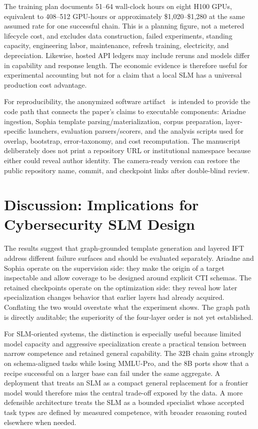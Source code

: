 \documentclass[conference]{IEEEtran}
\begin{document}
The training plan documents 51--64 wall-clock hours on eight H100 GPUs, equivalent to 408--512 GPU-hours or approximately \$1,020--\$1,280 at the same assumed rate for one successful chain. This is a planning figure, not a metered lifecycle cost, and excludes data construction, failed experiments, standing capacity, engineering labor, maintenance, refresh training, electricity, and depreciation. Likewise, hosted API ledgers may include reruns and models differ in capability and response length. The economic evidence is therefore useful for experimental accounting but not for a claim that a local SLM has a universal production cost advantage.

For reproducibility, the anonymized software artifact~\cite{anonartifact} is intended to provide the code path that connects the paper's claims to executable components: Ariadne ingestion, Sophia template parsing/materialization, corpus preparation, layer-specific launchers, evaluation parsers/scorers, and the analysis scripts used for overlap, bootstrap, error-taxonomy, and cost recomputation. The manuscript deliberately does not print a repository URL or institutional namespace because either could reveal author identity. The camera-ready version can restore the public repository name, commit, and checkpoint links after double-blind review.

\section{Discussion: Implications for Cybersecurity SLM Design}
The results suggest that graph-grounded template generation and layered IFT address different failure surfaces and should be evaluated separately. Ariadne and Sophia operate on the supervision side: they make the origin of a target inspectable and allow coverage to be designed around explicit CTI schemas. The retained checkpoints operate on the optimization side: they reveal how later specialization changes behavior that earlier layers had already acquired. Conflating the two would overstate what the experiment shows. The graph path is directly auditable; the superiority of the four-layer order is not yet established.

For SLM-oriented systems, the distinction is especially useful because limited model capacity and aggressive specialization create a practical tension between narrow competence and retained general capability. The 32B chain gains strongly on schema-aligned tasks while losing MMLU-Pro, and the 8B ports show that a recipe successful on a larger base can fail under the same aggregate. A deployment that treats an SLM as a compact general replacement for a frontier model would therefore miss the central trade-off exposed by the data. A more defensible architecture treats the SLM as a bounded specialist whose accepted task types are defined by measured competence, with broader reasoning routed elsewhere when needed.
\end{document}
